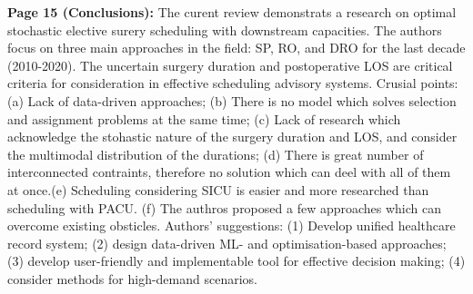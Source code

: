     \textbf{Page 15 (Conclusions):}
    The curent review demonstrats a research on optimal stochastic elective surery scheduling with downstream capacities. The authors focus on three main approaches in the field: SP, RO, and DRO for the last decade (2010-2020). The uncertain surgery duration and postoperative LOS are critical criteria for consideration in effective scheduling advisory systems. Crusial points: (a) Lack of data-driven approaches; (b) There is no model which solves selection and assignment problems at the same time; (c) Lack of research which acknowledge the stohastic nature of the surgery duration and LOS, and consider the multimodal distribution of the durations; (d) There is great number of interconnected contraints, therefore no solution which can deel with all of them at once.(e) Scheduling considering SICU is easier and more researched than scheduling with PACU. (f) The authros proposed a few approaches which can overcome existing obsticles. Authors' suggestions: (1) Develop unified healthcare record system; (2) design data-driven ML- and optimisation-based approaches; (3) develop user-friendly and implementable tool for effective decision making; (4) consider methods for high-demand scenarios.